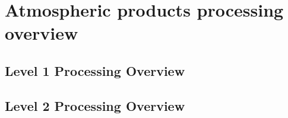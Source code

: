 \chapter{Atmospheric products processing overview}
\label{chapter:overview}
\pagestyle{localfancy}

\section{Level 1 Processing Overview}

\section{Level 2 Processing Overview}

